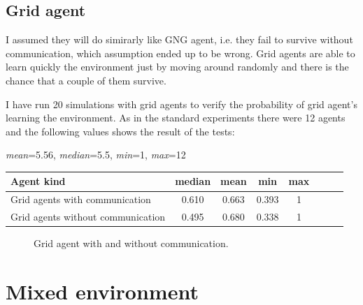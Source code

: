 \subsection{Grid agent}            

I assumed they will do simirarly like GNG agent, i.e. they fail to survive without communication, which assumption ended up to be wrong. Grid agents are able to learn quickly the environment just by moving around randomly and there is the chance that a couple of them survive.

I have run 20 simulations with grid agents to verify the probability of grid agent's learning the environment. As in the standard experiments there were 12 agents and the following values shows the result of the tests:


\begin{center}   
  \emph{mean}=5.56, \emph{median}=5.5, \emph{min}=1, \emph{max}=12                 
\end{center}

\begin{center}   
  \begin{tabular}{l*{6}{c}r}
  Agent kind        & median & mean & min & max \\
  \hline  
  Grid agents with communication        & 0.610 & 0.663 & 0.393 & 1 \\
  Grid agents without communication        & 0.495 & 0.680 & 0.338 & 1 \\
  \end{tabular}                  
\end{center}



\begin{figure}[h!]
  \centering        
  \caption{Grid agent with and without communication.}           
  \label{experiments:gng}  
\end{figure} 

\clearpage

\section{Mixed environment}
                        
